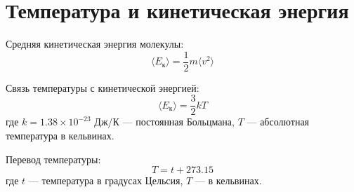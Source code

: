 \documentclass{article}
\begin{document}
\section*{Температура и кинетическая энергия}

Средняя кинетическая энергия молекулы:
\[
\langle E_{\text{к}} \rangle = \frac12 m \langle v^2 \rangle
\]

Связь температуры с кинетической энергией:
\[
\langle E_{\text{к}}\rangle = \frac32 k T
\]
где $k = 1.38\times10^{-23}$ Дж/К — постоянная Больцмана, $T$ — абсолютная температура в кельвинах.

Перевод температуры:
\[
T = t + 273.15
\]
где $t$ — температура в градусах Цельсия, $T$ — в кельвинах.
\end{document}
